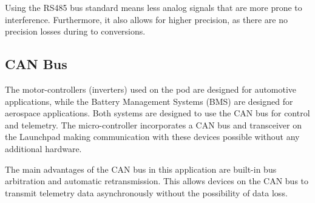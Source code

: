 Using the RS485 bus standard means less analog signals that are more prone to interference. Furthermore, it also allows for higher precision, as there are no precision losses during to conversions.

\subsection{CAN Bus}

The motor-controllers (inverters) used on the pod are designed for automotive applications, while the Battery Management Systems (BMS) are designed for aerospace applications. Both systems are designed to use the CAN bus for control and telemetry. The micro-controller incorporates a CAN bus and transceiver on the Launchpad making communication with these devices possible without any additional hardware.

The main advantages of the CAN bus in this application are built-in bus arbitration and automatic retransmission. This allows devices on the CAN bus to transmit telemetry data asynchronously without the possibility of data loss.


